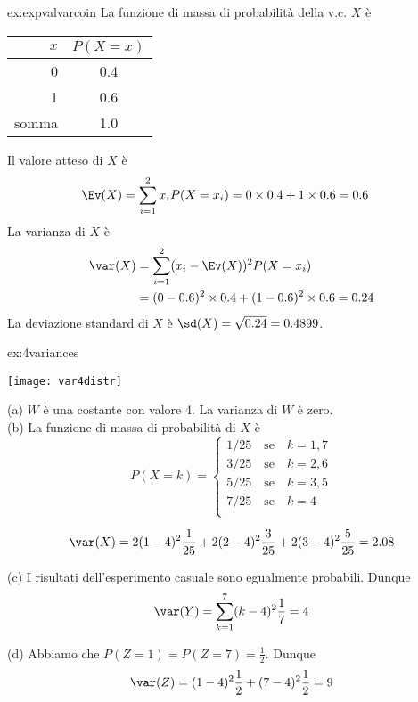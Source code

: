 \begin{sol}{ex:expvalvarcoin}
La funzione di massa di probabilità della v.c. $X$ è
\begin{center}
\begin{tabular}{rc}
  \hline
  $x$ & $P(X=x)$ \\
  \hline
  0 & 0.4 \\
  1 & 0.6\\  \hline
  somma & 1.0\\
  \hline
\end{tabular}
\end{center}

Il valore atteso di $X$ {\`e}
    \begin{align}
    \Ev(X) &= \sum_{i=1}^{2} x_i P(X=x_i) = 0 \times 0.4 + 1 \times 0.6 = 0.6\notag
    \end{align}
La varianza di $X$ {\`e}
    \begin{align}
    \var(X) &= \sum_{i=1}^{2} (x_i - \Ev(X))^2 P(X=x_i) \notag \\
    &= (0 - 0.6)^2 \times 0.4 + (1 - 0.6)^2 \times 0.6 = 0.24 \notag
    \end{align}
La deviazione standard di $X$ è
$
\sd(X) = \sqrt{0.24} = 0.4899
$.
\end{sol}


\begin{sol}{ex:4variances}
\begin{center}
  \texttt{[image: var4distr]}
\end{center}

(a) $W$ è una costante con valore 4.  La varianza di $W$ è zero.\\
(b) La funzione di massa di probabilità di $X$ è
$$
P(X=k) =
\begin{cases}
  1/25 \quad \text{se}\quad k = 1, 7\\
  3/25 \quad \text{se}\quad k = 2, 6\\
  5/25 \quad \text{se}\quad k = 3, 5\\
  7/25 \quad \text{se}\quad k = 4\\
  \end{cases}
$$

$$
\var(X) = 2 (1-4)^2 \frac{1}{25} + 2(2-4)^2 \frac{3}{25} +  2(3-4)^2 \frac{5}{25} = 2.08
$$

(c) I risultati dell'esperimento casuale sono egualmente probabili. Dunque
$$
\var(Y) = \sum_{k=1}^7 (k - 4)^2 \frac{1}{7} = 4
$$

(d) Abbiamo che $P(Z=1) =P(Z=7) = \frac{1}{2}$. Dunque
$$
\var(Z) = (1-4)^2 \frac{1}{2} + (7-4)^2 \frac{1}{2} = 9
$$
\end{sol}

